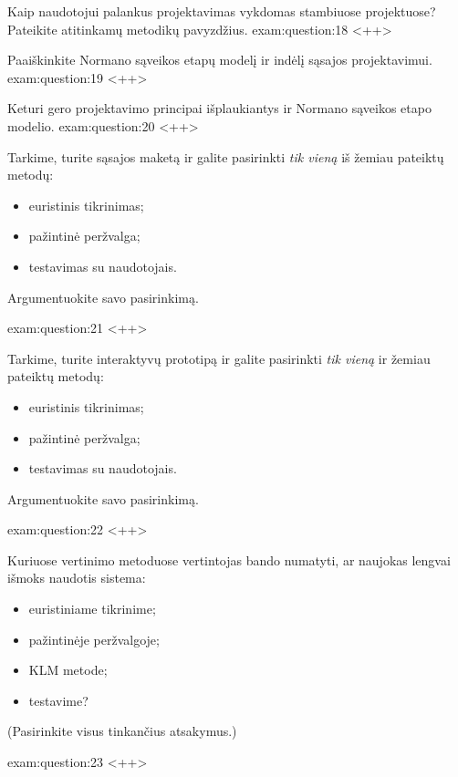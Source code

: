 \begin{question}{%
  Kaip naudotojui palankus projektavimas vykdomas stambiuose projektuose?
  Pateikite atitinkamų metodikų pavyzdžius.
  }{exam:question:18}
  <++>
\end{question}

\begin{question}{%
  Paaiškinkite Normano sąveikos etapų modelį ir indėlį sąsajos
  projektavimui.
  }{exam:question:19}
  <++>
\end{question}

\begin{question}{%
  Keturi gero projektavimo principai išplaukiantys ir Normano sąveikos
  etapo modelio.
  }{exam:question:20}
  <++>
\end{question}

\begin{question}{%
  Tarkime, turite sąsajos maketą ir galite pasirinkti \emph{tik vieną}
  iš žemiau pateiktų metodų:
  \begin{itemize}
    \item euristinis tikrinimas;
    \item pažintinė peržvalga;
    \item testavimas su naudotojais.
  \end{itemize}
  Argumentuokite savo pasirinkimą.
  }{exam:question:21}
  <++>
\end{question}

\begin{question}{%
  Tarkime, turite interaktyvų prototipą ir galite pasirinkti \emph{tik
  vieną} ir žemiau pateiktų metodų:
  \begin{itemize}
    \item euristinis tikrinimas;
    \item pažintinė peržvalga;
    \item testavimas su naudotojais.
  \end{itemize}
  Argumentuokite savo pasirinkimą.
  }{exam:question:22}
  <++>
\end{question}

\begin{question}{%
  Kuriuose vertinimo metoduose vertintojas bando numatyti, ar naujokas
  lengvai išmoks naudotis sistema:
  \begin{itemize}
    \item euristiniame tikrinime;
    \item pažintinėje peržvalgoje;
    \item KLM metode;
    \item testavime?
  \end{itemize}
  (Pasirinkite visus tinkančius atsakymus.)
  }{exam:question:23}
  <++>
\end{question}

